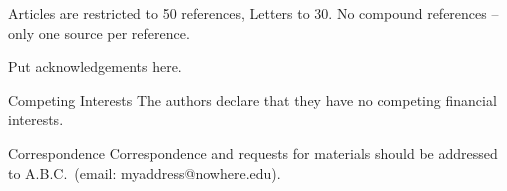\documentclass{nature}
\begin{document}

\begin{thebibliography}{1}
 Articles are restricted to 50 references, Letters
to 30.
 No compound references -- only one source per
reference.
\end{thebibliography}



\begin{addendum}
 \item Put acknowledgements here.
 \item[Competing Interests] The authors declare that they have no
competing financial interests.
 \item[Correspondence] Correspondence and requests for materials
should be addressed to A.B.C.~(email: myaddress@nowhere.edu).
\end{addendum}

\end{document}

